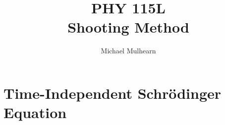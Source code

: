 \documentclass[12pt]{book}
\begin{document}
\newcommand{\ihbar}{\ensuremath{i \hbar}}
\newcommand{\Pss}{\ensuremath{\Psi^*}}
\newcommand{\dPsidt}{\ensuremath{ \frac{\partial \Psi}{\partial t} }}
\newcommand{\dPsidx}{\ensuremath{ \frac{\partial \Psi}{\partial x} }}
\newcommand{\ddPsidx}{\ensuremath{ \frac{\partial^2 \Psi}{\partial x^2} }}
\newcommand{\dPssdt}{\ensuremath{ \frac{\partial \Psi^*}{\partial t} }}
\newcommand{\dPssdx}{\ensuremath{ \frac{\partial \Psi^*}{\partial x} }}
\newcommand{\ddPssdx}{\ensuremath{ \frac{\partial^2 \Psi^*}{\partial x^2} }}

\newcommand{\dphidt}{\ensuremath{ \frac{d \phi}{dt} }}
\newcommand{\dpsidx}{\ensuremath{ \frac{d \psi}{dx} }}
\newcommand{\ddpsidx}{\ensuremath{ \frac{d^2 \psi}{dx^2} }}


\title{PHY 115L \\ Shooting Method }
\author{Michael Mulhearn}

\maketitle

\setcounter{chapter}{0}
\chapter{Time-Independent Schr\"odinger Equation}
\end{document}
